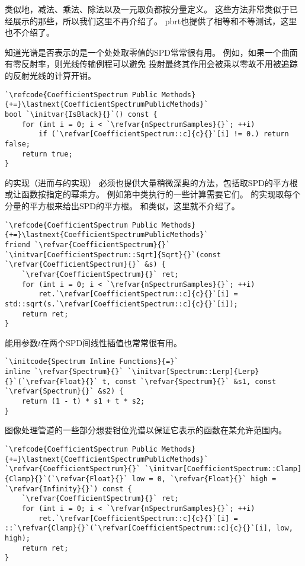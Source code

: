 类似地，减法、乘法、除法以及一元取负都按分量定义。
这些方法非常类似于已经展示的那些，所以我们这里不再介绍了。
pbrt也提供了相等和不等测试，这里也不介绍了。

知道光谱是否表示的是一个处处取零值的SPD常常很有用。
例如，如果一个曲面有零反射率，则光线传输例程可以避免
投射最终其作用会被乘以零故不用被追踪的反射光线的计算开销。
\begin{lstlisting}
`\refcode{CoefficientSpectrum Public Methods}{+=}\lastnext{CoefficientSpectrumPublicMethods}`
bool `\initvar{IsBlack}{}`() const {
    for (int i = 0; i < `\refvar{nSpectrumSamples}{}`; ++i)
        if (`\refvar[CoefficientSpectrum::c]{c}{}`[i] != 0.) return false;
    return true;
}
\end{lstlisting}

的实现（进而与的实现）
必须也提供大量稍微深奥的方法，包括取SPD的平方根或让函数按指定的幂乘方。
例如第中类执行的一些计算需要它们。
的实现取每个分量的平方根来给出SPD的平方根。
和类似，这里就不介绍了。
\begin{lstlisting}
`\refcode{CoefficientSpectrum Public Methods}{+=}\lastnext{CoefficientSpectrumPublicMethods}`
friend `\refvar{CoefficientSpectrum}{}` `\initvar[CoefficientSpectrum::Sqrt]{Sqrt}{}`(const `\refvar{CoefficientSpectrum}{}` &s) { 
    `\refvar{CoefficientSpectrum}{}` ret;
    for (int i = 0; i < `\refvar{nSpectrumSamples}{}`; ++i)
        ret.`\refvar[CoefficientSpectrum::c]{c}{}`[i] = std::sqrt(s.`\refvar[CoefficientSpectrum::c]{c}{}`[i]);
    return ret;
}
\end{lstlisting}

能用参数$t$在两个SPD间线性插值也常常很有用。
\begin{lstlisting}
`\initcode{Spectrum Inline Functions}{=}`
inline `\refvar{Spectrum}{}` `\initvar[Spectrum::Lerp]{Lerp}{}`(`\refvar{Float}{}` t, const `\refvar{Spectrum}{}` &s1, const `\refvar{Spectrum}{}` &s2) {
    return (1 - t) * s1 + t * s2;
}
\end{lstlisting}

图像处理管道的一些部分想要钳位光谱以保证它表示的函数在某允许范围内。
\begin{lstlisting}
`\refcode{CoefficientSpectrum Public Methods}{+=}\lastnext{CoefficientSpectrumPublicMethods}`
`\refvar{CoefficientSpectrum}{}` `\initvar[CoefficientSpectrum::Clamp]{Clamp}{}`(`\refvar{Float}{}` low = 0, `\refvar{Float}{}` high = `\refvar{Infinity}{}`) const {
    `\refvar{CoefficientSpectrum}{}` ret;
    for (int i = 0; i < `\refvar{nSpectrumSamples}{}`; ++i)
        ret.`\refvar[CoefficientSpectrum::c]{c}{}`[i] = ::`\refvar{Clamp}{}`(`\refvar[CoefficientSpectrum::c]{c}{}`[i], low, high);
    return ret;
}
\end{lstlisting}

